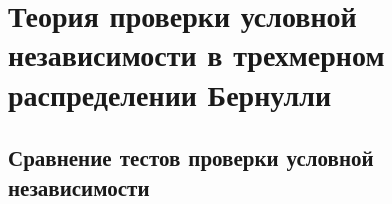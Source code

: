 \documentclass[a4paper,14pt]{extarticle}
\theoremstyle{definition}
\begin{document}

\newpage

\tableofcontents
\newpage
\section{Теория проверки условной независимости в трехмерном распределении Бернулли}











% 

\begin{centering}
    \section{Сравнение тестов проверки условной независимости}
\end{centering}





\newpage
\printbibliography
\end{document}
